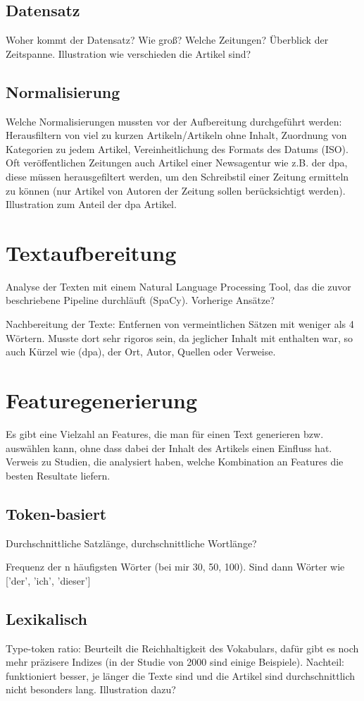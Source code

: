 \subsection{Datensatz}
Woher kommt der Datensatz? Wie groß? Welche Zeitungen? Überblick der Zeitspanne. Illustration wie verschieden die Artikel sind?
\subsection{Normalisierung}
Welche Normalisierungen mussten vor der Aufbereitung durchgeführt werden: Herausfiltern von viel zu kurzen Artikeln/Artikeln ohne Inhalt, Zuordnung von Kategorien zu jedem Artikel, Vereinheitlichung des Formats des Datums (ISO). Oft veröffentlichen Zeitungen auch Artikel einer Newsagentur wie z.B. der dpa, diese müssen herausgefiltert werden, um den Schreibstil einer Zeitung ermitteln zu können (nur Artikel von Autoren der Zeitung sollen berücksichtigt werden). Illustration zum Anteil der dpa Artikel.
\section{Textaufbereitung}\label{textprocessing}
Analyse der Texten mit einem Natural Language Processing Tool, das die zuvor beschriebene Pipeline durchläuft (SpaCy). Vorherige Ansätze?

Nachbereitung der Texte: Entfernen von vermeintlichen Sätzen mit weniger als 4 Wörtern. Musste dort sehr rigoros sein, da jeglicher Inhalt mit enthalten war, so auch Kürzel wie (dpa), der Ort, Autor, Quellen oder Verweise.
\section{Featuregenerierung}
Es gibt eine Vielzahl an Features, die man für einen Text generieren bzw. auswählen kann, ohne dass dabei der Inhalt des Artikels einen Einfluss hat. Verweis zu Studien, die analysiert haben, welche Kombination an Features die besten Resultate liefern.
\subsection{Token-basiert}
Durchschnittliche Satzlänge, durchschnittliche Wortlänge?

Frequenz der n häufigsten Wörter (bei mir 30, 50, 100). Sind dann Wörter wie ['der', 'ich', 'dieser']
\subsection{Lexikalisch}
Type-token ratio: Beurteilt die Reichhaltigkeit des Vokabulars, dafür gibt es noch mehr präzisere Indizes (in der Studie von 2000 sind einige Beispiele). Nachteil: funktioniert besser, je länger die Texte sind und die Artikel sind durchschnittlich nicht besonders lang. Illustration dazu?

